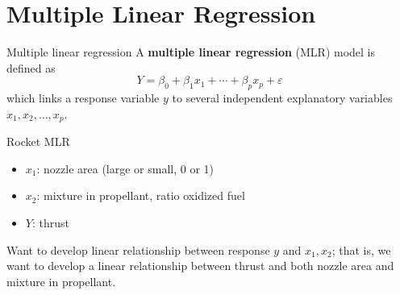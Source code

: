 \section{Multiple Linear Regression}
\begin{Definition}{Multiple linear regression}{}
    A \textbf{multiple linear regression} (MLR) model is defined as
    \[ Y=\beta_0+\beta_1 x_1+\cdots+\beta_p x_p+\varepsilon \]
    which links a response variable $ y $ to several
    independent explanatory variables $ x_1,x_2,\ldots,x_p $.
\end{Definition}
\begin{Example}{Rocket MLR}{}
    \begin{itemize}
        \item $ x_1 $: nozzle area (large or small, 0 or 1)
        \item $ x_2 $: mixture in propellant, ratio oxidized fuel
        \item $ Y $: thrust
    \end{itemize}
    Want to develop linear relationship between response $ y $
    and $ x_1,x_2 $; that is, we want to develop a linear relationship
    between thrust and both nozzle area and mixture in propellant.
\end{Example}

